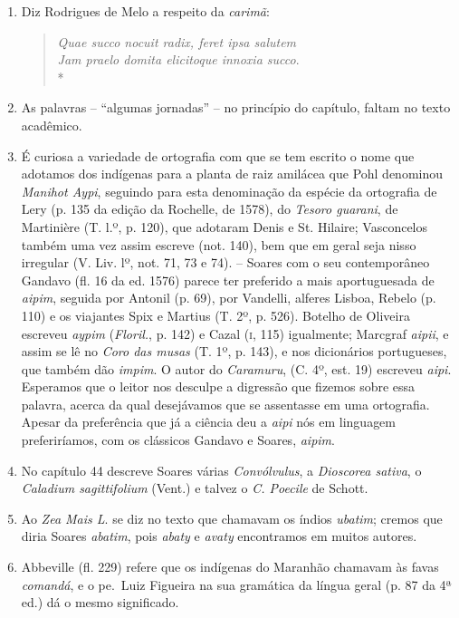 \begin{enumerate}
\item  Diz Rodrigues de Melo a respeito da \textit{carimã}:
\begin{verse}
\textit{Quae succo nocuit radix, feret ipsa salutem\\
Jam praelo domita elicitoque innoxia succo}. \\*
\end{verse}


\item As palavras -- ``algumas jornadas'' -- no princípio do capítulo, faltam no texto 
acadêmico.

\item É curiosa a variedade de ortografia com que se tem escrito o nome que adotamos 
dos indígenas para a planta de raiz amilácea que Pohl denominou \textit{Manihot Aypi}, 
seguindo para esta denominação da espécie da ortografia de Lery (p. 135 da edição da 
Rochelle, de 1578), do \textit{Tesoro guarani}, de Martinière (T. l.º, p. 120), que adotaram 
Denis e St. Hilaire; Vasconcelos também uma vez assim escreve (not. 140), bem que em 
geral seja nisso irregular (V. Liv. lº, not. 71, 73 e 74). -- Soares com o seu contemporâneo 
Gandavo (fl. 16 da ed. 1576) parece ter preferido a mais aportuguesada de \textit{aipim}, 
seguida por Antonil (p. 69), por Vandelli, alferes Lisboa, Rebelo (p. 110) e os viajantes 
Spix e Martius (T. 2º, p. 526). Botelho de Oliveira escreveu \textit{aypim} (\textit{Floril.}, p. 142) e 
Cazal (\textsc{i}, 115) igualmente; Marcgraf \textit{aipii}, e assim se lê no \textit{Coro das musas} (T. 1º, p. 
143), e nos dicionários portugueses, que também dão \textit{impim}. O autor do \textit{Caramuru}, (C. 
4º, est. 19) escreveu \textit{aipi}.
Esperamos que o leitor nos desculpe a digressão que fizemos sobre essa palavra, acerca 
da qual desejávamos que se assentasse em uma ortografia. Apesar da preferência que já a 
ciência deu a \textit{aipi} nós em linguagem preferiríamos, com os clássicos Gandavo e Soares, \textit{aipim}.

\item No capítulo 44 descreve Soares várias \textit{Convólvulus}, a \textit{Dioscorea sativa}, 
o \textit{Caladium sagittifolium} (Vent.) e talvez o \textit{C. Poecile} de Schott.

\item Ao \textit{Zea Mais L}. se diz no texto que chamavam os índios \textit{ubatim}; cremos que diria 
Soares \textit{abatim}, pois \textit{abaty} e \textit{avaty} encontramos em muitos autores.

\item Abbeville (fl. 229) refere que os indígenas do Maranhão chamavam às favas \textit{comandá}, 
e o pe.~Luiz Figueira na sua gramática da língua geral (p. 87 da 4ª ed.) dá o 
mesmo significado.


\end{enumerate}
